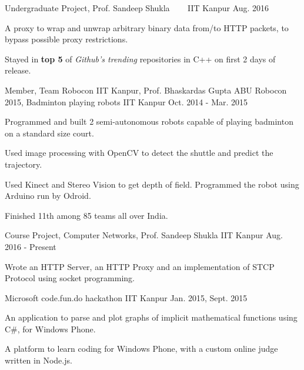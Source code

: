 \begin{cventries}
  \cventry
  {Undergraduate Project, Prof. Sandeep Shukla}
  {\href{https://github.com/sakshamsharma/HTTP-Over-Protocol}{}
    \ \ \ }
  {IIT Kanpur}
  {Aug. 2016}
  {
    \begin{cvitems}
    \item A proxy to wrap and unwrap arbitrary binary data from/to
      HTTP packets, to bypass possible proxy restrictions.
    \item Stayed in \textbf{top 5} of \textit{Github's trending}
      repositories in C++ on first 2 days of release.
    \end{cvitems}
  }

  \cventry
  {Member, Team Robocon IIT Kanpur, Prof. Bhaskardas Gupta}
  {ABU Robocon 2015, Badminton playing robots}
  {IIT Kanpur}
  {Oct. 2014 - Mar. 2015}
  {
    \begin{cvitems}
    \item Programmed and built 2 semi-autonomous robots
      capable of playing badminton on a standard size court.
    \item Used image processing with OpenCV to detect the shuttle
      and predict the trajectory.
    \item Used Kinect and Stereo Vision to get depth of
      field. Programmed the robot using Arduino run by Odroid.
    \item Finished 11th among 85 teams all over India.
    \end{cvitems}
  }

  \cventry
  {Course Project, Computer Networks, Prof. Sandeep Shukla}
  {\href{https://github.com/sakshamsharma/Network-Implementation}{
      }}
  {IIT Kanpur}
  {Aug. 2016 - Present}
  {
    \begin{cvitems}
    \item Wrote an HTTP Server, an HTTP Proxy and an implementation of
      STCP Protocol using socket programming.
    \end{cvitems}
  }


  {Microsoft code.fun.do hackathon}
  {IIT Kanpur}
  {Jan. 2015, Sept. 2015}
  {
    \begin{cvitems}
    \item An application to parse and plot graphs of implicit
      mathematical functions using C\#, for Windows Phone.
    \item A platform to learn coding for Windows Phone, with a
      custom online judge written in Node.js.
    \end{cvitems}
  }

\end{cventries}

